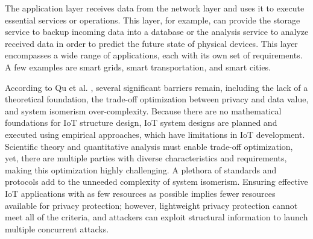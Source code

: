The application layer receives data from the network layer and uses it to
execute essential services or operations. This layer, for example, can provide
the storage service to backup incoming data into a database or the analysis
service to analyze received data in order to predict the future state of
physical devices. This layer encompasses a wide range of applications, each
with its own set of requirements. A few examples are smart grids, smart
transportation, and smart cities.


According to Qu et al. \cite{Qu2018Privacy}, several significant barriers
remain, including the lack of a theoretical foundation, the trade-off optimization
between privacy and data value, and system isomerism over-complexity. Because
there are no mathematical foundations for IoT structure design, IoT system
designs are planned and executed using empirical approaches, which have
limitations in IoT development. Scientific theory and quantitative analysis
must enable trade-off optimization, yet, there are multiple parties with
diverse characteristics and requirements, making this optimization highly
challenging. A plethora of standards and protocols add to the unneeded complexity
of system isomerism. Ensuring effective IoT applications with as few resources
as possible implies fewer resources available for privacy protection; however,
lightweight privacy protection cannot meet all of the criteria, and attackers
can exploit structural information to launch multiple concurrent attacks.

